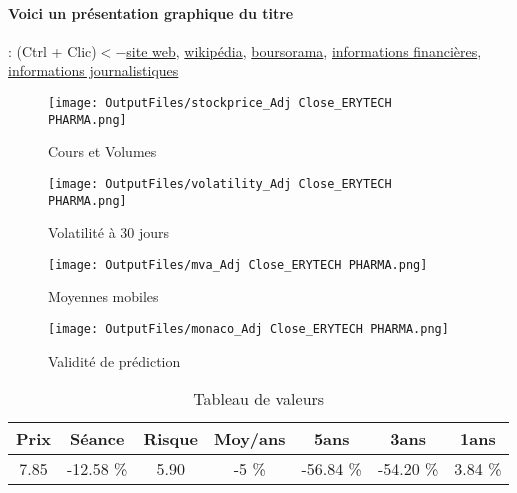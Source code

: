 \documentclass[11pt,a4paper]{report}%
\begin{document}
\paragraph{Voici un présentation graphique du titre} : (Ctrl + Clic)$<-$\href{https://erytech.com/fr/}{site web}, \href{https://fr.m.wikipedia.org/wiki/Erytech_Pharma}{wikipédia}, \href{https://www.boursorama.com/cours/1rPERYP}{boursorama}, \href{https://www.qwant.com/?q=site:https:%2f%2fwww.easybourse.com%2faction-societe%2fERYTECH-PHARMA&t=web&client=ext-firefox-hp}{informations financières}, \href{https://bourse.lerevenu.com/cours-de-bourse/fiche-valeur-synthese/ERYTECH-PHARMA/ERYP-FR}{informations journalistiques}
\begin{figure}[!htb]
   \begin{minipage}{0.5\textwidth}
     \centering
     \texttt{[image: OutputFiles/stockprice\_Adj Close\_ERYTECH PHARMA.png]}
     \caption{Cours et Volumes}\label{Fig:price_ERYTECH PHARMA}
   \end{minipage}\hfill
   \begin{minipage}{0.5\textwidth}
     \centering
     \texttt{[image: OutputFiles/volatility\_Adj Close\_ERYTECH PHARMA.png]}
     \caption{Volatilité à 30 jours}\label{Fig:volat_ERYTECH PHARMA}
   \end{minipage}
\end{figure}
\begin{figure}[!htb]
   \begin{minipage}{0.5\textwidth}
     \centering
     \texttt{[image: OutputFiles/mva\_Adj Close\_ERYTECH PHARMA.png]}
     \caption{Moyennes mobiles}\label{Fig:mva_ERYTECH PHARMA}
   \end{minipage}\hfill
   \begin{minipage}{0.5\textwidth}
     \centering
     \texttt{[image: OutputFiles/monaco\_Adj Close\_ERYTECH PHARMA.png]}
     \caption{Validité de prédiction}\label{Fig:prediction_ERYTECH PHARMA}
   \end{minipage}
\end{figure}

\begin{table}[H]
  \centering
    \begin{tabular}{|c|c|c|c|c|c|c|}
    \hline
    Prix & Séance & Risque  & Moy/ans & 5ans & 3ans & 1ans \\
    \hline
    7.85 &    -12.58 \%    & 5.90 & -5 \% & -56.84 \% & -54.20 \% & 3.84 \% \\
    \hline
    \end{tabular}%
        \label{tab:table_ERYTECH PHARMA}%
      \caption{Tableau de valeurs}
\end{table}%
\end{document}
